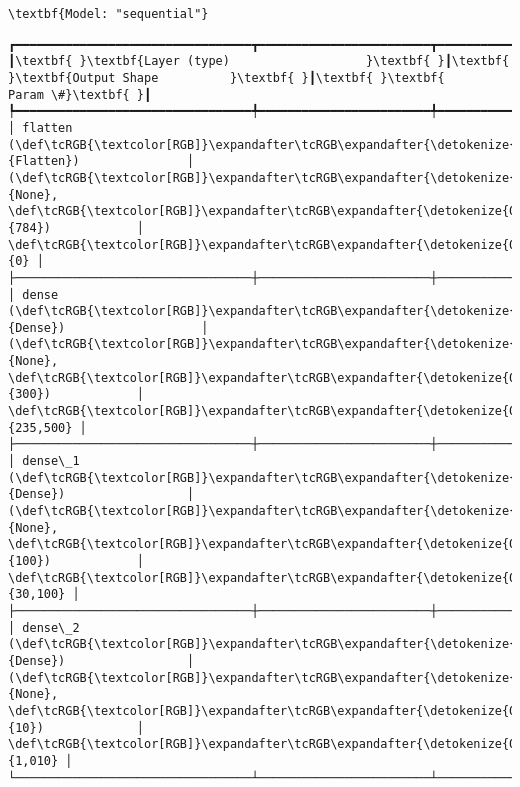 \documentclass[12pt letter]{report}
\begin{document}
    
    \begin{Verbatim}[commandchars=\\\{\}]
\textbf{Model: "sequential"}

    \end{Verbatim}

    
    
    \begin{Verbatim}[commandchars=\\\{\}]
┏━━━━━━━━━━━━━━━━━━━━━━━━━━━━━━━━━┳━━━━━━━━━━━━━━━━━━━━━━━━┳━━━━━━━━━━━━━━━┓
┃\textbf{ }\textbf{Layer (type)                   }\textbf{ }┃\textbf{ }\textbf{Output Shape          }\textbf{ }┃\textbf{ }\textbf{      Param \#}\textbf{ }┃
┡━━━━━━━━━━━━━━━━━━━━━━━━━━━━━━━━━╇━━━━━━━━━━━━━━━━━━━━━━━━╇━━━━━━━━━━━━━━━┩
│ flatten (\def\tcRGB{\textcolor[RGB]}\expandafter\tcRGB\expandafter{\detokenize{0,135,255}}{Flatten})               │ (\def\tcRGB{\textcolor[RGB]}\expandafter\tcRGB\expandafter{\detokenize{0,215,255}}{None}, \def\tcRGB{\textcolor[RGB]}\expandafter\tcRGB\expandafter{\detokenize{0,175,0}}{784})            │             \def\tcRGB{\textcolor[RGB]}\expandafter\tcRGB\expandafter{\detokenize{0,175,0}}{0} │
├─────────────────────────────────┼────────────────────────┼───────────────┤
│ dense (\def\tcRGB{\textcolor[RGB]}\expandafter\tcRGB\expandafter{\detokenize{0,135,255}}{Dense})                   │ (\def\tcRGB{\textcolor[RGB]}\expandafter\tcRGB\expandafter{\detokenize{0,215,255}}{None}, \def\tcRGB{\textcolor[RGB]}\expandafter\tcRGB\expandafter{\detokenize{0,175,0}}{300})            │       \def\tcRGB{\textcolor[RGB]}\expandafter\tcRGB\expandafter{\detokenize{0,175,0}}{235,500} │
├─────────────────────────────────┼────────────────────────┼───────────────┤
│ dense\_1 (\def\tcRGB{\textcolor[RGB]}\expandafter\tcRGB\expandafter{\detokenize{0,135,255}}{Dense})                 │ (\def\tcRGB{\textcolor[RGB]}\expandafter\tcRGB\expandafter{\detokenize{0,215,255}}{None}, \def\tcRGB{\textcolor[RGB]}\expandafter\tcRGB\expandafter{\detokenize{0,175,0}}{100})            │        \def\tcRGB{\textcolor[RGB]}\expandafter\tcRGB\expandafter{\detokenize{0,175,0}}{30,100} │
├─────────────────────────────────┼────────────────────────┼───────────────┤
│ dense\_2 (\def\tcRGB{\textcolor[RGB]}\expandafter\tcRGB\expandafter{\detokenize{0,135,255}}{Dense})                 │ (\def\tcRGB{\textcolor[RGB]}\expandafter\tcRGB\expandafter{\detokenize{0,215,255}}{None}, \def\tcRGB{\textcolor[RGB]}\expandafter\tcRGB\expandafter{\detokenize{0,175,0}}{10})             │         \def\tcRGB{\textcolor[RGB]}\expandafter\tcRGB\expandafter{\detokenize{0,175,0}}{1,010} │
└─────────────────────────────────┴────────────────────────┴───────────────┘

    \end{Verbatim}
\end{document}
